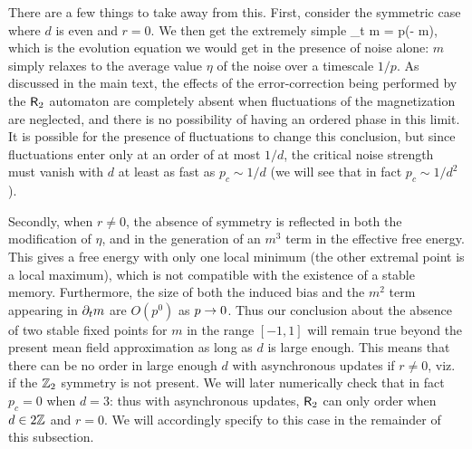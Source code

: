 \documentclass[pra,aps,twocolumn,groupedaddress,superscriptaddress,nofootinbib,preprintnumbers]{revtex4-2}
\begin{document}
\begin{widetext}
		There are a few things to take away from this. First, consider the symmetric case where $d$ is even and $r=0$. We then get the extremely simple
		\be \p_t m = p(\eta - m),\ee 
		which is the evolution equation we would get in the presence of noise alone: $m$ simply relaxes to the average value $\eta$ of the noise over a timescale $1/p$. As discussed in the main text, the effects of the error-correction being performed by the $\mathsf{R}_2$ automaton are completely absent when fluctuations of the magnetization are neglected, and there is no possibility of having an ordered phase in this limit. It is possible for the presence of fluctuations to change this conclusion, but since fluctuations enter only at an order of at most $1/d$, the critical noise strength must vanish with $d$ at least as fast as $p_c \sim 1/d$ (we will see that in fact $p_c \sim 1/d^2$). 
		
		Secondly, when $r\neq 0$, the absence of symmetry is reflected in both the modification of $\eta$, and in the generation of an $m^3$ term in the effective free energy. This gives a free energy with only one local minimum (the other extremal point is a local maximum), which is not compatible with the existence of a stable memory. Furthermore, the size of both the induced bias and the $m^2$ term appearing in $\partial_t m$ are $O(p^0)$ as $p\rightarrow 0$. Thus our conclusion about the absence of two stable fixed points for $m$ in the range $[-1,1]$ will remain true beyond the present mean field approximation as long as $d$ is large enough. This means that there can be no order in large enough $d$ with asynchronous updates if $r\neq 0$, viz. if the $\mathbb{Z}_2$ symmetry is not present. We will later numerically check that in fact $p_c = 0$ when $d=3$: thus with asynchronous updates, $\mathsf{R}_2$ can only order when $d \in 2\mathbb{Z}$ and $r=0$. We will accordingly specify to this case in the remainder of this subsection. 
		
		

\end{widetext}
\end{document}
